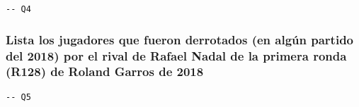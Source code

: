 \begin{verbatim}
-- Q4
\end{verbatim}





\subsubsection{Lista los jugadores que fueron derrotados (en algún partido del 2018) por el rival de Rafael Nadal de la primera ronda (R128) de Roland Garros de 2018}

\begin{verbatim}
-- Q5
\end{verbatim}